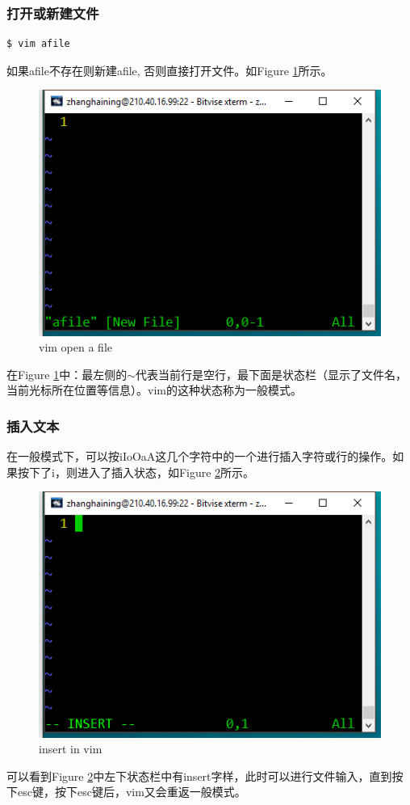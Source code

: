 \subsubsection{打开或新建文件}
\begin{verbatim}
$ vim afile
\end{verbatim}
如果afile不存在则新建afile, 否则直接打开文件。如Figure \ref{BOvim1}所示。
\begin{figure}
\includegraphics[width=1\linewidth]{BasicOperation/BOvim1}
\caption{vim open a file}
\label{BOvim1}
\end{figure}
在Figure \ref{BOvim1}中：最左侧的$\sim$代表当前行是空行，最下面是状态栏（显示了文件名，当前光标所在位置等信息）。vim的这种状态称为一般模式。

\subsubsection{插入文本}
在一般模式下，可以按iIoOaA这几个字符中的一个进行插入字符或行的操作。如果按下了i，则进入了插入状态，如Figure \ref{BOvim2}所示。
\begin{figure}
\includegraphics[width=1\linewidth]{BasicOperation/BOvim2}
\caption{insert in vim}
\label{BOvim2}
\end{figure}
可以看到Figure \ref{BOvim2}中左下状态栏中有insert字样，此时可以进行文件输入，直到按下esc键，按下esc键后，vim又会重返一般模式。
